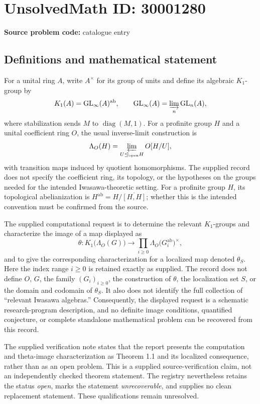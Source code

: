 \documentclass[11pt]{article}
\begin{document}
\section*{UnsolvedMath ID: 30001280}
\textbf{Source problem code:} catalogue entry
\subsection{Definitions and mathematical statement}
For a unital ring \(A\), write \(A^\times\) for its group of units and define its algebraic \(K_1\)-group by
\[
K_1(A)=\mathrm{GL}_\infty(A)^{\mathrm{ab}},
\qquad
\mathrm{GL}_\infty(A)=\varinjlim_n\mathrm{GL}_n(A),
\]
where stabilization sends \(M\) to \(\operatorname{diag}(M,1)\). For a profinite group \(H\) and a unital coefficient ring \(O\), the usual inverse-limit construction is
\[
\Lambda_O(H)=\varprojlim_{U\trianglelefteq_{\mathrm{open}}H}O[H/U],
\]
with transition maps induced by quotient homomorphisms. The supplied record does not specify the coefficient ring, its topology, or the hypotheses on the groups needed for the intended Iwasawa-theoretic setting. For a profinite group \(H\), its topological abelianization is \(H^{\mathrm{ab}}=H/\overline{[H,H]}\); whether this is the intended convention must be confirmed from the source.

The supplied computational request is to determine the relevant \(K_1\)-groups and characterize the image of a map displayed as
\[
\theta:K_1\bigl(\Lambda_O(G)\bigr)
\longrightarrow
\prod_{i\geq 0}\Lambda_O\bigl(G_i^{\mathrm{ab}}\bigr)^\times,
\]
and to give the corresponding characterization for a localized map denoted \(\theta_S\). Here the index range \(i\geq 0\) is retained exactly as supplied. The record does not define \(O\), \(G\), the family \((G_i)_{i\geq 0}\), the construction of \(\theta\), the localization set \(S\), or the domain and codomain of \(\theta_S\). It also does not identify the full collection of ``relevant Iwasawa algebras.'' Consequently, the displayed request is a schematic research-program description, and no definite image conditions, quantified conjecture, or complete standalone mathematical problem can be recovered from this record.

The supplied verification note states that the report presents the computation and theta-image characterization as Theorem 1.1 and its localized consequence, rather than as an open problem. This is a supplied source-verification claim, not an independently checked theorem statement. The registry nevertheless retains the status \emph{open}, marks the statement \emph{unrecoverable}, and supplies no clean replacement statement. These qualifications remain unresolved.
\end{document}
